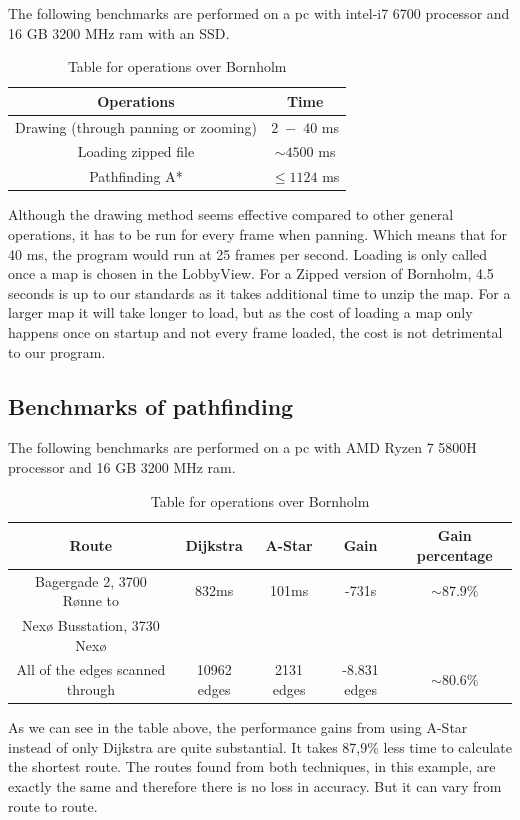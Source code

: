 The following benchmarks are performed on a pc with intel-i7 6700 processor and 16 GB 3200 MHz ram with an SSD.
\begin{table}[h]
\centering
 \begin{tabular}{ c|c }
\textbf{Operations} & \textbf{Time} \\
\hline
Drawing (through panning or zooming) & $2 \;-\; 40$ ms \\
Loading zipped file & $\sim4500$ ms \\
Pathfinding A* & $\leq 1124$ ms \\
\end{tabular}
 \caption{\centering Table for operations over Bornholm}
\end{table}

Although the drawing method seems effective compared to other general operations, it has to be run for every frame when panning. Which means that for 40 ms, the program would run at 25 frames per second.  Loading is only called once a map is chosen in the LobbyView. For a Zipped version of Bornholm, 4.5 seconds is up to our standards as it takes additional time to unzip the map. For a larger map it will take longer to load, but as the cost of loading a map only happens once on startup and not every frame loaded, the cost is not detrimental to our program.

 \subsection{Benchmarks of pathfinding}

 The following benchmarks are performed on a pc with AMD Ryzen 7 5800H processor and 16 GB 3200 MHz ram. 
 \begin{table}[h]
\centering
 \begin{tabular}{ c|c|c|c|c }
\textbf{Route} & \textbf{Dijkstra} & \textbf{A-Star} & \textbf{Gain} & \textbf{Gain percentage} \\
\hline
   Bagergade 2, 3700 Rønne to
 & 832ms & 101ms & -731s & $\sim87.9$\% \\
Nexø Busstation, 3730 Nexø
 &  &  &  &  \\
   All of the edges scanned through & 10962 edges & 2131 edges & -8.831 edges & $\sim80.6$\%  \\
\end{tabular}
 \caption{\centering Table for operations over Bornholm}
\end{table}

As we can see in the table above, the performance gains from using A-Star instead of only Dijkstra are quite substantial. It takes 87,9\% less time to calculate the shortest route. The routes found from both techniques, in this example, are exactly the same and therefore there is no loss in accuracy. But it can vary from route to route.



